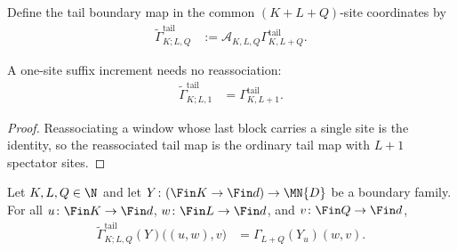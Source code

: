 \begin{definition}
    \label{def:reassociated_tail_boundary_map}
    \leanok
    Define the tail boundary map in the common $(K+L+Q)$-site coordinates by
    \begin{align}
        \widetilde\Gamma^{\mathrm{tail}}_{K;L,Q}
         & :=\mathscr A_{K,L,Q}\Gamma^{\mathrm{tail}}_{K,L+Q}.
    \end{align}
\end{definition}

\begin{lemma}
    \label{thm:reassociated_tail_boundary_one_site}
    \leanok
    A one-site suffix increment needs no reassociation:
    \begin{align}
        \widetilde\Gamma^{\mathrm{tail}}_{K;L,1}
         & =\Gamma^{\mathrm{tail}}_{K,L+1}.
        \label{eq:reassociated_tail_boundary_one_site}
    \end{align}
\end{lemma}

\begin{proof}
    \leanok
    Reassociating a window whose last block carries a single site is the
    identity, so the reassociated tail map is the ordinary tail map with $L+1$
    spectator sites.
\end{proof}

\begin{lemma}
    \label{thm:reassociated_tail_boundary_three_block}
    \leanok
    Let $K,L,Q\in\N$ and let $Y\colon(\Fin K\to\Fin d)\to\MN{D}$ be a
    boundary family. For all $u\colon\Fin K\to\Fin d$,
    $w\colon\Fin L\to\Fin d$, and $v\colon\Fin Q\to\Fin d$,
    \begin{align}
        \widetilde\Gamma^{\mathrm{tail}}_{K;L,Q}(Y)\bigl((u,w),v\bigr)
         & =\Gamma_{L+Q}(Y_u)(w,v).
    \end{align}
\end{lemma}

